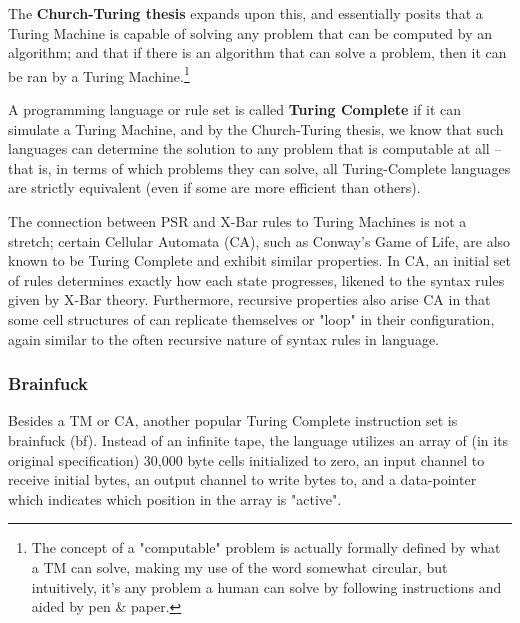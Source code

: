 \documentclass[runningheads]{llncs}
\begin{document}
The \textbf{Church-Turing thesis}\cite{kleene1952}
expands upon this, and essentially posits that a Turing Machine is capable of solving any problem that can be computed by an algorithm; and that if there is an algorithm that can solve a problem, then it can be ran by a Turing Machine.\footnote{The concept of a "computable" problem is actually formally defined by what a TM can solve, making my use of the word somewhat circular, but intuitively, it's any problem a human can solve by following instructions and aided by pen \& paper.}

A programming language or rule set is called \textbf{Turing Complete} if it can simulate a Turing Machine, and by the Church-Turing thesis, we know that such languages can determine the solution to any problem that is computable at all -- that is, in terms of which problems they can solve, all Turing-Complete languages are strictly equivalent (even if some are more efficient than others).

The connection between PSR and X-Bar rules to Turing Machines is not a stretch; certain Cellular Automata (CA), such as Conway's Game of Life, are also known to be Turing Complete and exhibit similar properties.\cite{berlekamp2001}
In CA, an initial set of rules determines exactly how each state progresses, likened to the syntax rules given by X-Bar theory. Furthermore, recursive properties also arise CA in that some cell structures of can replicate themselves or "loop" in their configuration, again similar to the often recursive nature of syntax rules in language.

\subsubsection{Brainfuck}
Besides a TM or CA, another popular Turing Complete instruction set is brainfuck (bf). Instead of an infinite tape, the language utilizes an array of (in its original specification) 30,000 byte cells initialized to zero, an input channel to receive initial bytes, an output channel to write bytes to, and a data-pointer which indicates which position in the array is "active".
\end{document}
